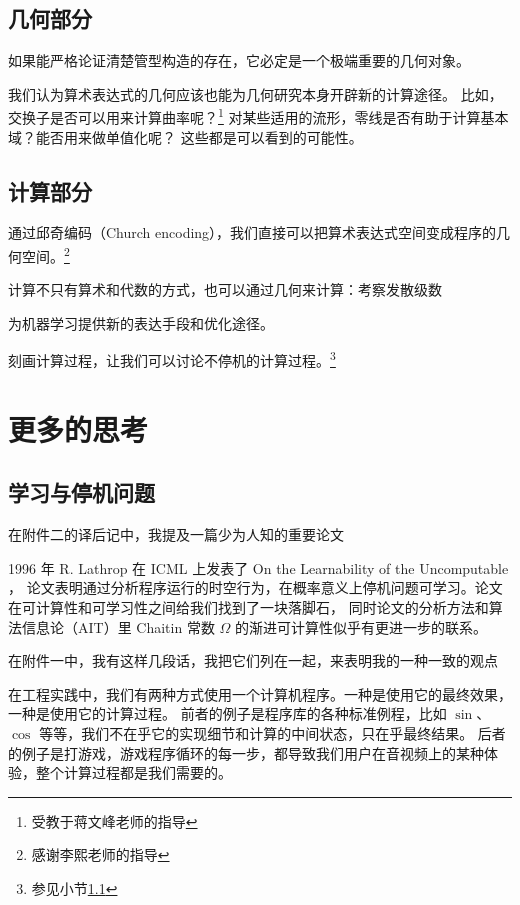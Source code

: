 \documentclass[a4paper,12pt]{article}
\numberwithin{problem}{section}
\numberwithin{definition}{section}
\numberwithin{lemma}{section}
\numberwithin{proposition}{section}
\numberwithin{theorem}{section}
\numberwithin{grammar}{section}
\numberwithin{program}{section}
\numberwithin{convention}{section}
\numberwithin{corollary}{section}
\begin{document}
\subsection{几何部分}

如果能严格论证清楚管型构造的存在，它必定是一个极端重要的几何对象。

我们认为算术表达式的几何应该也能为几何研究本身开辟新的计算途径。
比如，交换子是否可以用来计算曲率呢？\footnote{受教于蒋文峰老师的指导}
对某些适用的流形，零线是否有助于计算基本域？能否用来做单值化呢？
这些都是可以看到的可能性。

\subsection{计算部分}

通过邱奇编码（Church encoding），我们直接可以把算术表达式空间变成程序的几何空间。\footnote{感谢李熙老师的指导}

计算不只有算术和代数的方式，也可以通过几何来计算：考察发散级数

为机器学习提供新的表达手段和优化途径。

刻画计算过程，让我们可以讨论不停机的计算过程。\footnote{参见小节\ref{sec:learnandhalt}}

\newpage

\section{更多的思考}

\subsection{学习与停机问题}\label{sec:learnandhalt}

在附件二的译后记中，我提及一篇少为人知的重要论文

\begin{displayquote}
1996 年 R. Lathrop 在 ICML 上发表了 On the Learnability of the Uncomputable ，
论文表明通过分析程序运行的时空行为，在概率意义上停机问题可学习。论文在可计算性和可学习性之间给我们找到了一块落脚石，
同时论文的分析方法和算法信息论（AIT）里 Chaitin 常数 $\Omega$ 的渐进可计算性似乎有更进一步的联系。
\end{displayquote}

在附件一中，我有这样几段话，我把它们列在一起，来表明我的一种一致的观点

\begin{displayquote}
在工程实践中，我们有两种方式使用一个计算机程序。一种是使用它的最终效果，一种是使用它的计算过程。
前者的例子是程序库的各种标准例程，比如 $\sin$、$\cos$ 等等，我们不在乎它的实现细节和计算的中间状态，只在乎最终结果。
后者的例子是打游戏，游戏程序循环的每一步，都导致我们用户在音视频上的某种体验，整个计算过程都是我们需要的。
\end{displayquote}
\end{document}
